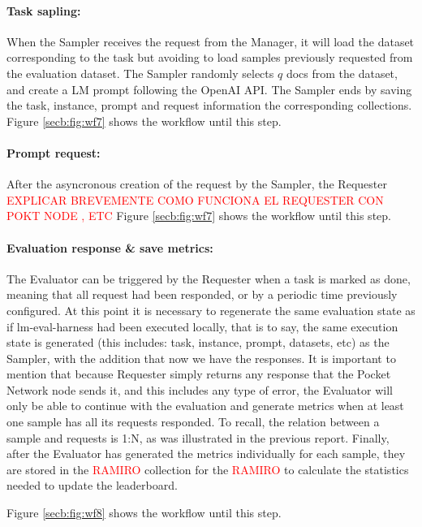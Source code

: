 \paragraph{Task sapling:}
When the Sampler receives the request from the Manager, it will load the dataset corresponding to the task but avoiding to load samples previously requested from the evaluation dataset. 
The Sampler randomly selects $q$ docs from the dataset, and create a \gls{LM} prompt following the OpenAI API. The Sampler ends by saving the task, instance, prompt and request information the corresponding collections.
Figure \ref{secb:fig:wf7} shows the workflow until this step.

\paragraph{Prompt request:}
After the asyncronous creation of the request by the Sampler, the Requester \textcolor{red}{EXPLICAR BREVEMENTE COMO FUNCIONA EL REQUESTER CON POKT NODE , ETC}
Figure \ref{secb:fig:wf7} shows the workflow until this step.


\paragraph{Evaluation response \& save metrics:}
The Evaluator can be triggered by the Requester when a task is marked as done, meaning that all request had been responded, or by a periodic time previously configured. 
At this point it is necessary to regenerate the same evaluation state as if lm-eval-harness had been executed locally, that is to say, the same execution state is generated (this includes: task, instance, prompt, datasets, etc) as the Sampler, with the addition that now we have the responses. 
It is important to mention that because Requester simply returns any response that the Pocket Network node sends it, and this includes any type of error, the Evaluator will only be able to continue with the evaluation and generate metrics when at least one sample has all its requests responded. 
To recall, the relation between a sample and requests is 1:N, as was illustrated in the previous report. 
Finally, after the Evaluator has generated the metrics individually for each sample, they are stored in the \textcolor{red}{RAMIRO} collection for the \textcolor{red}{RAMIRO} to calculate the statistics needed to update the leaderboard. 

Figure \ref{secb:fig:wf8} shows the workflow until this step.


